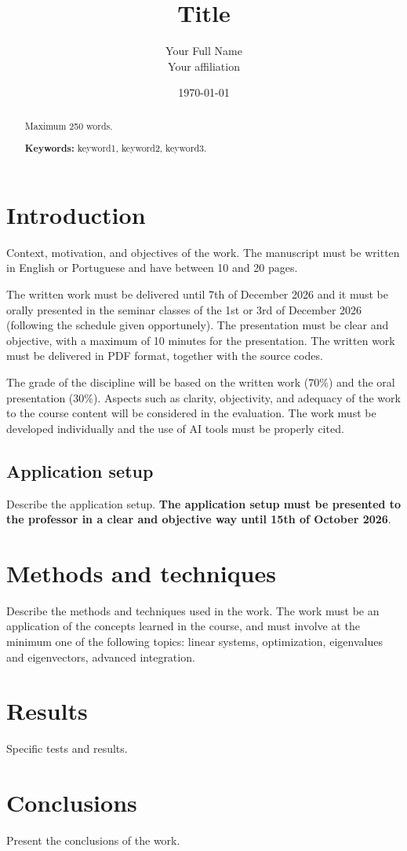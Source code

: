 \documentclass[12pt,a4paper]{article}
\begin{document}
\title{Title}
\author{Your Full Name\\{\small Your affiliation}}
\date{\today}
\maketitle

\begin{abstract}
    Maximum 250 words.
    
    \textbf{Keywords:} keyword1, keyword2, keyword3.
\end{abstract}

\section{Introduction}

Context, motivation, and objectives of the work. The manuscript must be written in English or Portuguese and have between 10 and 20 pages.

The written work must be delivered until 7th of December 2026 and it must be orally presented in the seminar classes of the 1st or 3rd of December 2026 (following the schedule given opportunely). The presentation must be clear and objective, with a maximum of 10 minutes for the presentation. The written work must be delivered in PDF format, together with the source codes.

The grade of the discipline will be based on the written work (70\%) and the oral presentation (30\%). Aspects such as clarity, objectivity, and adequacy of the work to the course content \cite{Konzen2026a} will be considered in the evaluation. The work must be developed individually and the use of AI tools must be properly cited.   

\subsection{Application setup}

Describe the application setup. \textbf{The application setup must be presented to the professor in a clear and objective way until 15th of October 2026}. 

\section{Methods and techniques}

Describe the methods and techniques used in the work. The work must be an application of the concepts learned in the course, and must involve at the minimum one of the following topics: linear systems, optimization, eigenvalues and eigenvectors, advanced integration.

\section{Results}

Specific tests and results.

\section{Conclusions}

Present the conclusions of the work. 



\end{document}
